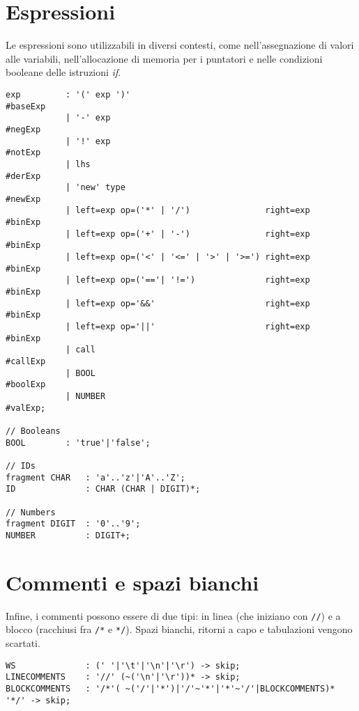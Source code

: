 \documentclass[../report.tex]{subfiles}
\begin{document}
\section{Espressioni}\label{s:espressioni}
Le espressioni sono utilizzabili in diversi contesti, come nell'assegnazione di valori alle variabili, nell'allocazione di memoria per i puntatori e nelle condizioni booleane delle istruzioni \textit{if}.
\begin{lstlisting}[style=antlr]
exp         : '(' exp ')'                                       #baseExp
            | '-' exp                                           #negExp
            | '!' exp                                           #notExp
            | lhs                                               #derExp
            | 'new' type                                        #newExp
            | left=exp op=('*' | '/')               right=exp   #binExp
            | left=exp op=('+' | '-')               right=exp   #binExp
            | left=exp op=('<' | '<=' | '>' | '>=') right=exp   #binExp
            | left=exp op=('=='| '!=')              right=exp   #binExp
            | left=exp op='&&'                      right=exp   #binExp
            | left=exp op='||'                      right=exp   #binExp
            | call                                              #callExp
            | BOOL                                              #boolExp
            | NUMBER                                            #valExp;

// Booleans
BOOL        : 'true'|'false';

// IDs
fragment CHAR   : 'a'..'z'|'A'..'Z';
ID              : CHAR (CHAR | DIGIT)*;

// Numbers
fragment DIGIT  : '0'..'9';
NUMBER          : DIGIT+;
\end{lstlisting}

\section{Commenti e spazi bianchi}\label{s:commenti-spazi-bianchi}
Infine, i commenti possono essere di due tipi: in linea (che iniziano con \verb|//|) e a blocco (racchiusi fra \verb|/*| e \verb|*/|). Spazi bianchi, ritorni a capo e tabulazioni vengono scartati.
\begin{lstlisting}[style=antlr]
WS              : (' '|'\t'|'\n'|'\r') -> skip;
LINECOMMENTS    : '//' (~('\n'|'\r'))* -> skip;
BLOCKCOMMENTS   : '/*'( ~('/'|'*')|'/'~'*'|'*'~'/'|BLOCKCOMMENTS)* '*/' -> skip;
\end{lstlisting}
\end{document}

